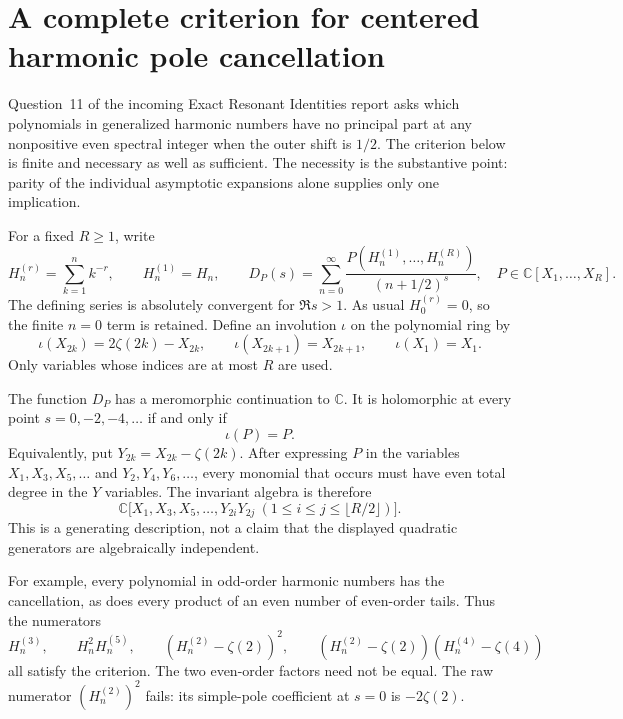 \section{A complete criterion for centered harmonic pole cancellation}
\label{hc:section}

Question~11 of the incoming Exact Resonant Identities report \cite{RepoExact} asks which
polynomials in generalized harmonic numbers have no principal part at
any nonpositive even spectral integer when the outer shift is $1/2$.
The criterion below is finite and necessary as well as sufficient.
The necessity is the substantive point: parity of the individual
asymptotic expansions alone supplies only one implication.

For a fixed $R\ge1$, write
\[
 H_n^{(r)}=\sum_{k=1}^n k^{-r},\qquad H_n^{(1)}=H_n,
 \qquad
 D_P(s)=\sum_{n=0}^{\infty}
 \frac{P(H_n^{(1)},\ldots,H_n^{(R)})}{(n+1/2)^s},
 \quad P\in\mathbb C[X_1,\ldots,X_R].
\]
The defining series is absolutely convergent for $\Re s>1$.
As usual $H_0^{(r)}=0$, so the finite $n=0$ term is retained.
Define an involution $\iota$ on the polynomial ring by
\begin{equation}\label{hc:involution}
 \iota(X_{2k})=2\zeta(2k)-X_{2k},\qquad
 \iota(X_{2k+1})=X_{2k+1},\qquad \iota(X_1)=X_1.
\end{equation}
Only variables whose indices are at most $R$ are used.

\begin{theorem}
\label{hc:main}
The function $D_P$ has a meromorphic continuation to $\mathbb C$.
It is holomorphic at every point $s=0,-2,-4,\ldots$ if and only if
\begin{equation}\label{hc:criterion}
                         \iota(P)=P.
\end{equation}
Equivalently, put $Y_{2k}=X_{2k}-\zeta(2k)$. After expressing $P$ in
the variables $X_1,X_3,X_5,\ldots$ and $Y_2,Y_4,Y_6,\ldots$, every
monomial that occurs must have even total degree in the $Y$ variables.
The invariant algebra is therefore
\begin{equation}\label{hc:invariant-ring}
 \mathbb C\bigl[X_1,X_3,X_5,\ldots,
        Y_{2i}Y_{2j}\ (1\le i\le j\le\lfloor R/2\rfloor)\bigr].
\end{equation}
This is a generating description, not a claim that the displayed
quadratic generators are algebraically independent.
\end{theorem}

For example, every polynomial in odd-order harmonic numbers has the
cancellation, as does every product of an even number of even-order
tails. Thus the numerators
\[
 H_n^{(3)},\qquad
 H_n^2H_n^{(5)},\qquad
 (H_n^{(2)}-\zeta(2))^2,\qquad
 (H_n^{(2)}-\zeta(2))(H_n^{(4)}-\zeta(4))
\]
all satisfy the criterion. The two even-order factors need not be equal.
The raw numerator $(H_n^{(2)})^2$ fails: its simple-pole coefficient
at $s=0$ is $-2\zeta(2)$.

